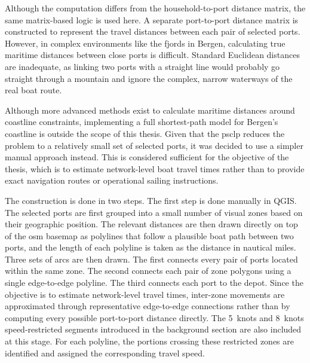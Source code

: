 \documentclass[12pt]{article}
\begin{document}
Although the computation differs from the household-to-port distance matrix, the same matrix-based logic is used here. A separate port-to-port distance matrix is constructed to represent the travel distances between each pair of selected ports. However, in complex environments like the fjords in Bergen, calculating true maritime distances between close ports is difficult. Standard Euclidean distances are inadequate, as linking two ports with a straight line would probably go straight through a mountain and ignore the complex, narrow waterways of the real boat route.

Although more advanced methods exist to calculate maritime distances around coastline constraints, implementing a full shortest-path model for Bergen's coastline is outside the scope of this thesis. Given that the \ac{psclp} reduces the problem to a relatively small set of selected ports, it was decided to use a simpler manual approach instead. This is considered sufficient for the objective of the thesis, which is to estimate network-level boat travel times rather than to provide exact navigation routes or operational sailing instructions.

The construction is done in two steps. The first step is done manually in QGIS. The selected ports are first grouped into a small number of visual zones based on their geographic position. The relevant distances are then drawn directly on top of the \ac{osm} basemap as polylines that follow a plausible boat path between two ports, and the length of each polyline is taken as the distance in nautical miles. Three sets of arcs are then drawn. The first connects every pair of ports located within the same zone. The second connects each pair of zone polygons using a single edge-to-edge polyline. The third connects each port to the depot. Since the objective is to estimate network-level travel times, inter-zone movements are approximated through representative edge-to-edge connections rather than by computing every possible port-to-port distance directly. The \qty{5}{knots} and \qty{8}{knots} speed-restricted segments introduced in the background section are also included at this stage. For each polyline, the portions crossing these restricted zones are identified and assigned the corresponding travel speed.
\end{document}
